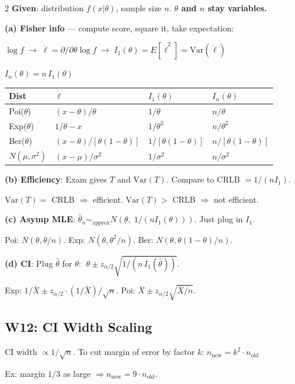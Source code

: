 \documentclass[8pt]{extarticle}
\begin{document}
\begin{multicols}{2}
\textbf{Given}: distribution $f(x|\theta)$, sample size $n$. \textbf{$\theta$ and $n$ stay variables.}

\textbf{(a) Fisher info} --- compute score, square it, take expectation:

$\log f \;\to\; \dot\ell = \partial/\partial\theta\log f \;\to\; I_1(\theta) = E[\dot\ell^2] = \text{Var}(\dot\ell)$

$I_n(\theta) = n\,I_1(\theta)$

\begin{tabular}{@{}llll@{}}
\textbf{Dist} & $\dot\ell$ & $I_1(\theta)$ & $I_n(\theta)$ \\
\midrule
Poi($\theta$) & $(x{-}\theta)/\theta$ & $1/\theta$ & $n/\theta$ \\
Exp($\theta$) & $1/\theta - x$ & $1/\theta^2$ & $n/\theta^2$ \\
Ber($\theta$) & $(x{-}\theta)/[\theta(1{-}\theta)]$ & $1/[\theta(1{-}\theta)]$ & $n/[\theta(1{-}\theta)]$ \\
$N(\mu,\sigma^2)$ & $(x{-}\mu)/\sigma^2$ & $1/\sigma^2$ & $n/\sigma^2$ \\
\end{tabular}

\textbf{(b) Efficiency}: Exam gives $T$ and $\text{Var}(T)$. Compare to CRLB $= 1/(nI_1)$.

$\text{Var}(T) = $ CRLB $\Rightarrow$ efficient. \; $\text{Var}(T) > $ CRLB $\Rightarrow$ not efficient.

\textbf{(c) Asymp MLE}: $\hat\theta_n \sim_{\text{approx}} N(\theta,\; 1/(nI_1(\theta)))$. Just plug in $I_1$.

Poi: $N(\theta, \theta/n)$. Exp: $N(\theta, \theta^2/n)$. Ber: $N(\theta, \theta(1{-}\theta)/n)$.

\textbf{(d) CI}: Plug $\hat\theta$ for $\theta$: $\;\hat\theta \pm z_{\alpha/2}\sqrt{1/(n\,I_1(\hat\theta))}$.

Exp: $1/\bar X \pm z_{\alpha/2}\cdot(1/\bar X)/\sqrt{n}$. \; Poi: $\bar X \pm z_{\alpha/2}\sqrt{\bar X/n}$.

\subsection{W12: CI Width Scaling}

CI width $\propto 1/\sqrt{n}$. To cut margin of error by factor $k$: $\boxed{n_{\text{new}} = k^2 \cdot n_{\text{old}}}$

Ex: margin $1/3$ as large $\Rightarrow n_{\text{new}} = 9 \cdot n_{\text{old}}$.


\end{multicols}
\end{document}
